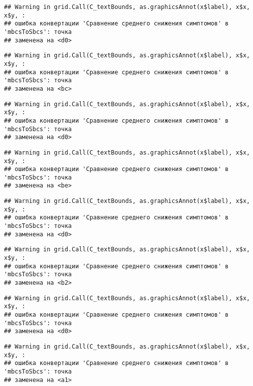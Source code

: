 \documentclass[
]{article}
\begin{document}
\begin{verbatim}
## Warning in grid.Call(C_textBounds, as.graphicsAnnot(x$label), x$x, x$y, :
## ошибка конвертации 'Сравнение среднего снижения симптомов' в 'mbcsToSbcs': точка
## заменена на <d0>
\end{verbatim}

\begin{verbatim}
## Warning in grid.Call(C_textBounds, as.graphicsAnnot(x$label), x$x, x$y, :
## ошибка конвертации 'Сравнение среднего снижения симптомов' в 'mbcsToSbcs': точка
## заменена на <bc>
\end{verbatim}

\begin{verbatim}
## Warning in grid.Call(C_textBounds, as.graphicsAnnot(x$label), x$x, x$y, :
## ошибка конвертации 'Сравнение среднего снижения симптомов' в 'mbcsToSbcs': точка
## заменена на <d0>
\end{verbatim}

\begin{verbatim}
## Warning in grid.Call(C_textBounds, as.graphicsAnnot(x$label), x$x, x$y, :
## ошибка конвертации 'Сравнение среднего снижения симптомов' в 'mbcsToSbcs': точка
## заменена на <be>
\end{verbatim}

\begin{verbatim}
## Warning in grid.Call(C_textBounds, as.graphicsAnnot(x$label), x$x, x$y, :
## ошибка конвертации 'Сравнение среднего снижения симптомов' в 'mbcsToSbcs': точка
## заменена на <d0>
\end{verbatim}

\begin{verbatim}
## Warning in grid.Call(C_textBounds, as.graphicsAnnot(x$label), x$x, x$y, :
## ошибка конвертации 'Сравнение среднего снижения симптомов' в 'mbcsToSbcs': точка
## заменена на <b2>
\end{verbatim}

\begin{verbatim}
## Warning in grid.Call(C_textBounds, as.graphicsAnnot(x$label), x$x, x$y, :
## ошибка конвертации 'Сравнение среднего снижения симптомов' в 'mbcsToSbcs': точка
## заменена на <d0>
\end{verbatim}

\begin{verbatim}
## Warning in grid.Call(C_textBounds, as.graphicsAnnot(x$label), x$x, x$y, :
## ошибка конвертации 'Сравнение среднего снижения симптомов' в 'mbcsToSbcs': точка
## заменена на <a1>
\end{verbatim}
\end{document}
